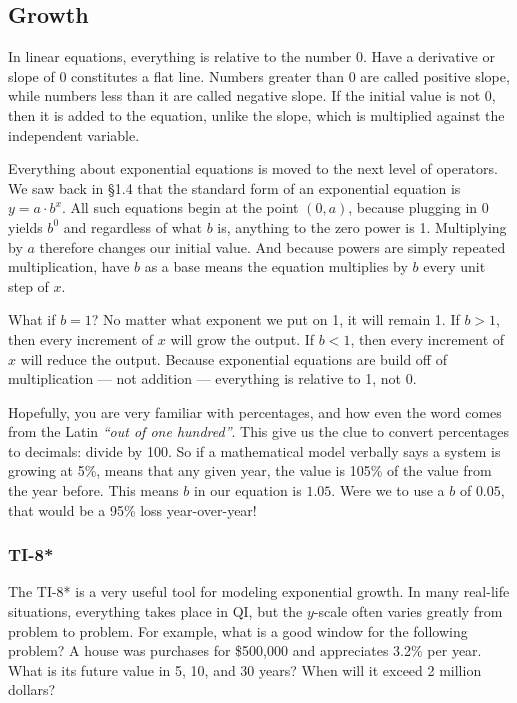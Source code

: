 \subsection{Growth}



In linear equations, everything is relative to the number 0.  Have a derivative or slope 
of 0 constitutes a flat line.  Numbers greater than 0 are called positive slope, while
numbers less than it are called negative slope.  If the initial value is not 0, then it is
added to the equation, unlike the slope, which is multiplied against the independent
variable.

Everything about exponential equations is moved to the next level of operators.  We saw
back in §1.4 that the standard form of an exponential equation is $y=a\cdot{}b^x$.
All such equations begin at the point $(0,a)$, because plugging in 0 yields $b^0$
and regardless of what $b$ is, anything to the zero power is 1.  Multiplying by $a$ 
therefore changes our initial value.  And because powers are simply repeated multiplication,
have $b$ as a base means the equation multiplies by $b$ every unit step of $x$.

What if $b=1$?  No matter what exponent we put on 1, it will remain 1.  If $b>1$,
then every increment of $x$ will grow the output.  If $b<1$, then every increment
of $x$ will reduce the output.  Because exponential equations are build off of 
multiplication --- not addition --- everything is relative to 1, not 0.

Hopefully, you are very familiar with percentages, and how even the word comes
from the Latin \textit{``out of one hundred''}.  This give us the clue to convert
percentages to decimals: divide by 100.  So if a mathematical model verbally says a 
system is growing at 5\%, means that any given year, the value is 105\% of the
value from the year before.  This means $b$ in our equation is $1.05$.  Were we 
to use a $b$ of $0.05$, that would be a 95\% loss year-over-year!

\subsubsection{TI-8*}
The TI-8* is a very useful tool for modeling exponential growth.  In many 
real-life situations, everything takes place in QI, but the $y$-scale often
varies greatly from problem to problem.  For example, what is a good
window for the following problem?  A house was purchases for \$500,000
and appreciates 3.2\% per year.  What is its future value in 5, 10, and 30
years?  When will it exceed 2 million dollars?

